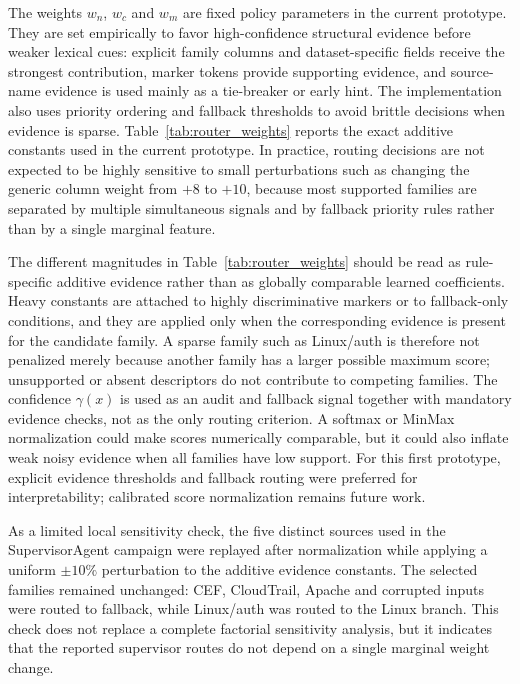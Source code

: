 \documentclass[conference]{IEEEtran}
\begin{document}
The weights $w_n$, $w_c$ and $w_m$ are fixed policy parameters in the current prototype. They are set empirically to favor high-confidence structural evidence before weaker lexical cues: explicit family columns and dataset-specific fields receive the strongest contribution, marker tokens provide supporting evidence, and source-name evidence is used mainly as a tie-breaker or early hint. The implementation also uses priority ordering and fallback thresholds to avoid brittle decisions when evidence is sparse. Table~\ref{tab:router_weights} reports the exact additive constants used in the current prototype. In practice, routing decisions are not expected to be highly sensitive to small perturbations such as changing the generic column weight from $+8$ to $+10$, because most supported families are separated by multiple simultaneous signals and by fallback priority rules rather than by a single marginal feature.

The different magnitudes in Table~\ref{tab:router_weights} should be read as rule-specific additive evidence rather than as globally comparable learned coefficients. Heavy constants are attached to highly discriminative markers or to fallback-only conditions, and they are applied only when the corresponding evidence is present for the candidate family. A sparse family such as Linux/auth is therefore not penalized merely because another family has a larger possible maximum score; unsupported or absent descriptors do not contribute to competing families. The confidence $\gamma(x)$ is used as an audit and fallback signal together with mandatory evidence checks, not as the only routing criterion. A softmax or MinMax normalization could make scores numerically comparable, but it could also inflate weak noisy evidence when all families have low support. For this first prototype, explicit evidence thresholds and fallback routing were preferred for interpretability; calibrated score normalization remains future work.

As a limited local sensitivity check, the five distinct sources used in the SupervisorAgent campaign were replayed after normalization while applying a uniform $\pm 10\%$ perturbation to the additive evidence constants. The selected families remained unchanged: CEF, CloudTrail, Apache and corrupted inputs were routed to fallback, while Linux/auth was routed to the Linux branch. This check does not replace a complete factorial sensitivity analysis, but it indicates that the reported supervisor routes do not depend on a single marginal weight change.
\end{document}
